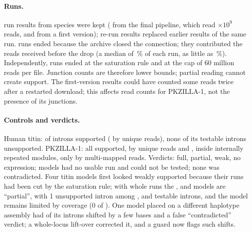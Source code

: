 \documentclass[11pt]{article}
\begin{document}
\paragraph{Runs.}  run results from  species were kept ( from the final
pipeline, which read $\times10^9$ reads, and  from a first version); re-run results
replaced earlier results of the same run.  runs ended because the archive closed the connection;
they contributed the reads received before the drop (a median of \,\% of each run, as
little as \,\%). Independently,  runs ended at the saturation
rule and  at the cap of 60 million reads per file. Junction counts are therefore lower bounds; partial
reading cannot create support. The  first-version results could have counted some reads twice after a
restarted download; this affects read counts for PKZILLA-1, not the presence of its junctions.

\paragraph{Controls and verdicts.} Human titin:  of  introns
supported ( by unique reads), none of its  testable introns
unsupported. PKZILLA-1: all  supported,  by unique reads and
, inside internally repeated modules, only by multi-mapped reads. Verdicts:  full,
 partial,  weak,  no expression;  models had no usable run and
 could not be tested; none was contradicted. Four titin models first looked weakly supported because
their runs had been cut by the saturation rule; with whole runs the ,  and  models
are ``partial'', with 1 unsupported intron among ,  and 
testable introns, and the  model remains limited by coverage (0 of ). One
model placed on a different haplotype assembly had  of its  introns shifted by
a few bases and a false ``contradicted'' verdict; a whole-locus lift-over corrected it, and a guard now flags such shifts.
\end{document}
